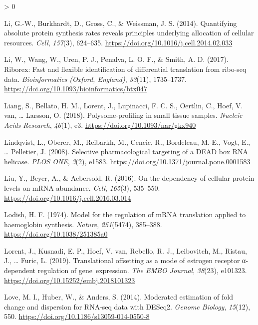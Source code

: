 \documentclass[
  12pt,
  openany]{book}
\newlength{\cslhangindent}
\newenvironment{CSLReferences}[2] %
 {%
  \setlength{\parindent}{0pt}
  \ifodd #1 \everypar{\setlength{\hangindent}{\cslhangindent}}\ignorespaces\fi
  \ifnum #2 > 0
  \setlength{\parskip}{#2\baselineskip}
  \fi
 }%
 {}
\begin{document}
\begin{CSLReferences}{1}{0}
\leavevmode\hypertarget{ref-Li2014}{}%
Li, G.-W., Burkhardt, D., Gross, C., \& Weissman, J. S. (2014). Quantifying absolute protein synthesis rates reveals principles underlying allocation of cellular resources. \emph{Cell}, \emph{157}(3), 624--635. \url{https://doi.org/10.1016/j.cell.2014.02.033}

\leavevmode\hypertarget{ref-Li2017}{}%
Li, W., Wang, W., Uren, P. J., Penalva, L. O. F., \& Smith, A. D. (2017). Riborex: Fast and flexible identification of differential translation from ribo-seq data. \emph{Bioinformatics (Oxford, England)}, \emph{33}(11), 1735--1737. \url{https://doi.org/10.1093/bioinformatics/btx047}

\leavevmode\hypertarget{ref-Liang2018}{}%
Liang, S., Bellato, H. M., Lorent, J., Lupinacci, F. C. S., Oertlin, C., Hoef, V. van, \ldots{} Larsson, O. (2018). Polysome-profiling in small tissue samples. \emph{Nucleic Acids Research}, \emph{46}(1), e3. \url{https://doi.org/10.1093/nar/gkx940}

\leavevmode\hypertarget{ref-Lindqvist2008}{}%
Lindqvist, L., Oberer, M., Reibarkh, M., Cencic, R., Bordeleau, M.-E., Vogt, E., \ldots{} Pelletier, J. (2008). Selective pharmacological targeting of a {DEAD} box {RNA} helicase. \emph{{PLOS} {ONE}}, \emph{3}(2), e1583. \url{https://doi.org/10.1371/journal.pone.0001583}

\leavevmode\hypertarget{ref-Liu2016}{}%
Liu, Y., Beyer, A., \& Aebersold, R. (2016). On the dependency of cellular protein levels on {mRNA} abundance. \emph{Cell}, \emph{165}(3), 535--550. \url{https://doi.org/10.1016/j.cell.2016.03.014}

\leavevmode\hypertarget{ref-Lodish1974}{}%
Lodish, H. F. (1974). Model for the regulation of {mRNA} translation applied to haemoglobin synthesis. \emph{Nature}, \emph{251}(5474), 385--388. \url{https://doi.org/10.1038/251385a0}

\leavevmode\hypertarget{ref-Lorent2019}{}%
Lorent, J., Kusnadi, E. P., Hoef, V. van, Rebello, R. J., Leibovitch, M., Ristau, J., \ldots{} Furic, L. (2019). Translational offsetting as a mode of estrogen receptor α-dependent regulation of gene~expression. \emph{The {EMBO} Journal}, \emph{38}(23), e101323. \url{https://doi.org/10.15252/embj.2018101323}

\leavevmode\hypertarget{ref-Love2014}{}%
Love, M. I., Huber, W., \& Anders, S. (2014). Moderated estimation of fold change and dispersion for {RNA}-seq data with {DESeq}2. \emph{Genome Biology}, \emph{15}(12), 550. \url{https://doi.org/10.1186/s13059-014-0550-8}


\end{CSLReferences}
\end{document}

